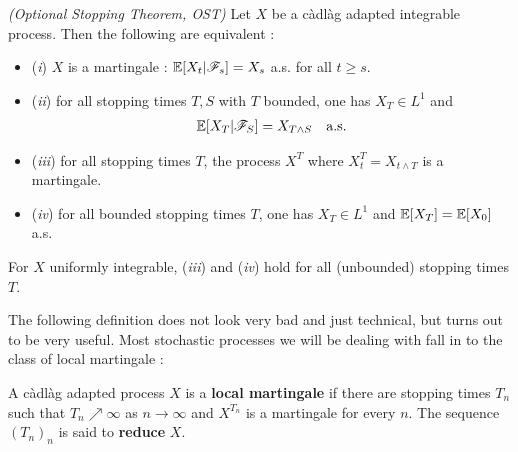 \documentclass[12pt,a4paper]{article}
\renewenvironment{i}
{\begin{itemize} 
	}%
	{\end{itemize}
}
\begin{document}
\thm \emph{(Optional Stopping Theorem, OST)} Let $X$ be a c\`adl\`ag adapted integrable process. Then the following are equivalent :
\begin{i}
\item[(\textit{i})] $X$ is a martingale : $\mathbb{E}[X_t | \mathscr{F}_s]  = X_s$ a.s. for all $t\geq s$.
\item[(\textit{ii})] for all stopping times $T,S$ with $T$ bounded, one has $X_T \in L^1$ and
\begin{align*}
\mathbb{E}[X_T | \mathscr{F}_S] = X_{T\wedge S} \quad \text{a.s.}
\end{align*}
\item[(\textit{iii})] for all stopping times $T$, the process $X^T$ where $X_t^T = X_{t\wedge T}$ is a martingale.
\item[(\textit{iv})] for all bounded stopping times $T$, one has $X_T \in L^1$ and $\mathbb{E}[X_T]= \mathbb{E}[X_0]$ a.s.
\end{i}
For $X$ uniformly integrable, (\textit{iii}) and (\textit{iv}) hold for all (unbounded) stopping times $T$.
\s

The following definition does not look very bad and just technical, but turns out to be very useful. Most stochastic processes we will be dealing with fall in to the class of local martingale :
\s

 A c\`adl\`ag adapted process $X$ is a \textbf{local martingale} if there are stopping times $T_n$ such that $T_n \nearrow \infty$ as $n\rightarrow \infty$ and $X^{T_n}$ is a martingale for every $n$. The sequence $(T_n)_n$ is said to \textbf{reduce} $X$.
\s
\end{document}
